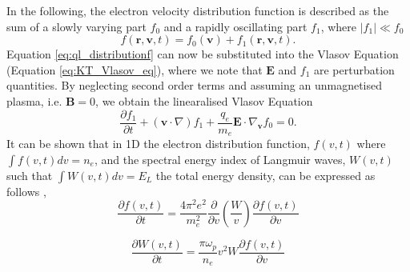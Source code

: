 In the following, the electron velocity distribution function is described as the sum of a slowly varying part $f_0$ and a rapidly oscillating part $f_1$, where $\vert f_1 \vert \ll f_0$
\begin{equation}
\label{eq:ql_distributionf}
f(\mathbf{r}, \mathbf{v}, t) = f_0(\mathbf{v}) + f_1(\mathbf{r}, \mathbf{v}, t).
\end{equation} 
Equation \ref{eq:ql_distributionf} can now be substituted into the Vlasov Equation (Equation \ref{eq:KT_Vlasov_eq}), where we note that $\mathbf{E}$ and $f_1$ are perturbation quantities. By neglecting second order terms and assuming an unmagnetised plasma, i.e. $\mathbf{B} = 0$, we obtain the linearalised Vlasov Equation
\begin{equation}
\label{eq:linear_vlasov}
\frac{\partial f_1}{\partial t} + (\mathbf{v} \cdot \nabla)f_1 + \frac{q_e}{m_e} \mathbf{E} \cdot \nabla_\mathbf{v}f_0 = 0.
\end{equation} 
It can be shown that in 1D the electron distribution function, $f(v,t)$ where $\int f(v,t) dv = n_e$, and the spectral energy index of Langmuir waves, $W(v,t)$ such that $\int W(v,t) dv = E_L$ the total energy density, can be expressed as follows \citep{Vedenov1963,Reid2014},
\begin{equation}\label{eq:dfdt}
    \frac{\partial f(v,t)}{\partial t}=\frac{4 \pi^2 e^2}{m_e^2} \frac{\partial}{\partial v} \left( \frac{W}{v} \right) \frac{\partial f(v,t)}{\partial v}
\end{equation}

\begin{equation}\label{eq:dWdt}
    \frac{\partial W(v,t)}{\partial t}= \frac{\pi \omega_p}{n_e} v^2 W \frac{\partial f(v,t)}{\partial v}
\end{equation}

